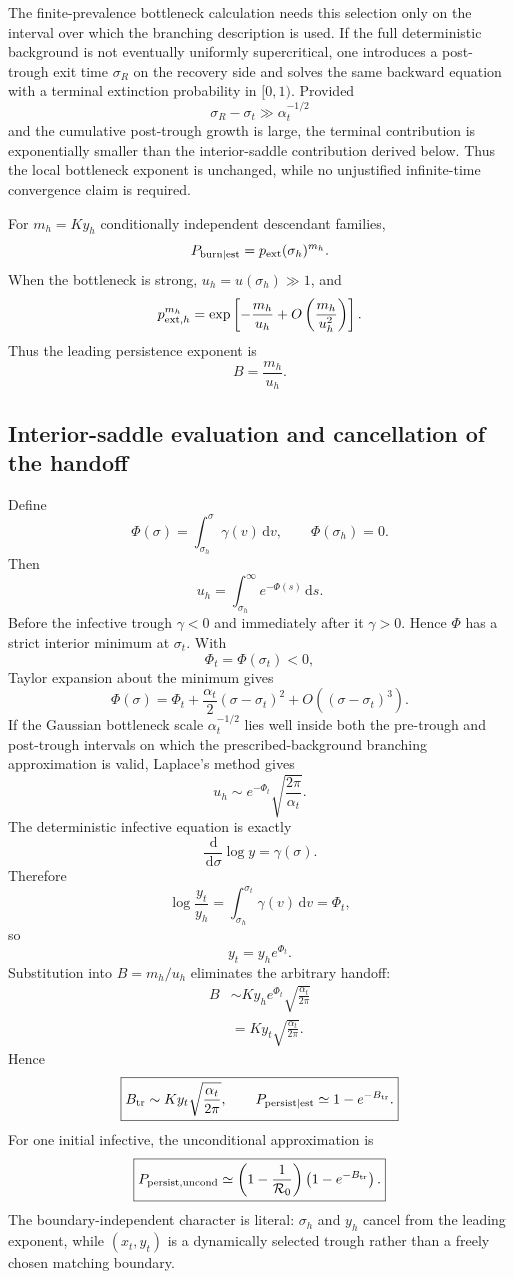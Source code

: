 \documentclass[11pt]{article}
\newcommand{\Rzero}{\mathcal R_0}
\newcommand{\dd}{\,\mathrm{d}}
\begin{document}
The finite-prevalence bottleneck calculation needs this selection only on the interval over which the branching description is used. If the full deterministic background is not eventually uniformly supercritical, one introduces a post-trough exit time $\sigma_R$ on the recovery side and solves the same backward equation with a terminal extinction probability in $[0,1)$. Provided
\[
\sigma_R-\sigma_t\gg\alpha_t^{-1/2}
\]
and the cumulative post-trough growth is large, the terminal contribution is exponentially smaller than the interior-saddle contribution derived below. Thus the local bottleneck exponent is unchanged, while no unjustified infinite-time convergence claim is required.

For $m_h=K y_h$ conditionally independent descendant families,
\[
P_{\rm burn\mid est}=p_{\rm ext}(\sigma_h)^{m_h}.
\]
When the bottleneck is strong, $u_h=u(\sigma_h)\gg1$, and
\[
p_{{\rm ext},h}^{m_h}
=\exp\left[-\frac{m_h}{u_h}+O\left(\frac{m_h}{u_h^2}\right)\right].
\]
Thus the leading persistence exponent is
\[
\boxed{B=\frac{m_h}{u_h}.}
\]

\subsection{Interior-saddle evaluation and cancellation of the handoff}
Define
\[
\Phi(\sigma)=\int_{\sigma_h}^{\sigma}\gamma(v)\dd v,
\qquad
\Phi(\sigma_h)=0.
\]
Then
\[
u_h=\int_{\sigma_h}^{\infty}e^{-\Phi(s)}\dd s.
\]
Before the infective trough $\gamma<0$ and immediately after it $\gamma>0$.  Hence $\Phi$ has a strict interior minimum at $\sigma_t$.  With
\[
\Phi_t=\Phi(\sigma_t)<0,
\]
Taylor expansion about the minimum gives
\[
\Phi(\sigma)
=\Phi_t+\frac{\alpha_t}{2}(\sigma-\sigma_t)^2
+O((\sigma-\sigma_t)^3).
\]
If the Gaussian bottleneck scale $\alpha_t^{-1/2}$ lies well inside both the pre-trough and post-trough intervals on which the prescribed-background branching approximation is valid, Laplace's method gives
\[
\boxed{
u_h\sim e^{-\Phi_t}\sqrt{\frac{2\pi}{\alpha_t}}.}
\]
The deterministic infective equation is exactly
\[
\frac{\dd}{\dd\sigma}\log y=\gamma(\sigma).
\]
Therefore
\[
\log\frac{y_t}{y_h}
=\int_{\sigma_h}^{\sigma_t}\gamma(v)\dd v
=\Phi_t,
\]
so
\[
\boxed{y_t=y_h e^{\Phi_t}.}
\]
Substitution into $B=m_h/u_h$ eliminates the arbitrary handoff:
\[
\begin{aligned}
B
&\sim K y_h e^{\Phi_t}\sqrt{\frac{\alpha_t}{2\pi}}\\
&=K y_t\sqrt{\frac{\alpha_t}{2\pi}}.
\end{aligned}
\]
Hence
\[
\boxed{
B_{\rm tr}\sim K y_t\sqrt{\frac{\alpha_t}{2\pi}},
\qquad
P_{\rm persist\mid est}\simeq1-e^{-B_{\rm tr}}.
}
\]
For one initial infective, the unconditional approximation is
\[
\boxed{
P_{\rm persist,uncond}
\simeq
\left(1-\frac1{\Rzero}\right)
\left(1-e^{-B_{\rm tr}}\right).
}
\]
The boundary-independent character is literal: $\sigma_h$ and $y_h$ cancel from the leading exponent, while $(x_t,y_t)$ is a dynamically selected trough rather than a freely chosen matching boundary.
\end{document}
